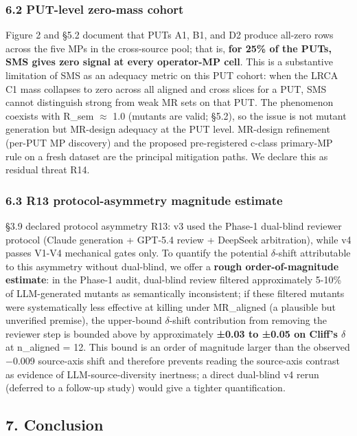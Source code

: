 \documentclass[review,12pt,authoryear]{elsarticle}
\begin{document}
\subsubsection{6.2 PUT-level zero-mass cohort}\label{put-level-zero-mass-cohort}

Figure 2 and §5.2 document that PUTs A1, B1, and D2 produce all-zero
rows across the five MPs in the cross-source pool; that is,
\textbf{for 25\% of the PUTs, SMS gives zero signal at every operator-MP
cell}. This is a substantive limitation of SMS as an adequacy metric on
this PUT cohort: when the LRCA C1 mass collapses to zero across all
aligned and cross slices for a PUT, SMS cannot distinguish strong from
weak MR sets on that PUT. The phenomenon coexists with R\_sem $\approx$ 1.0
(mutants are valid; §5.2), so the issue is not mutant generation but
MR-design adequacy at the PUT level. MR-design refinement (per-PUT
MP discovery) and the proposed pre-registered c-class primary-MP rule
on a fresh dataset are the principal mitigation paths. We declare this
as residual threat R14.

\subsubsection{6.3 R13 protocol-asymmetry magnitude estimate}\label{r13-protocol-asymmetry-magnitude-estimate}

§3.9 declared protocol asymmetry R13: v3 used the Phase-1 dual-blind
reviewer protocol (Claude generation + GPT-5.4 review + DeepSeek
arbitration), while v4 passes V1-V4 mechanical gates only. To quantify
the potential $\delta$-shift attributable to this asymmetry without dual-blind,
we offer a \textbf{rough order-of-magnitude estimate}: in the Phase-1
audit, dual-blind review filtered approximately 5-10\% of LLM-generated
mutants as semantically inconsistent; if these filtered mutants were
systematically less effective at killing under MR\_aligned (a plausible
but unverified premise), the upper-bound $\delta$-shift contribution from
removing the reviewer step is bounded above by approximately
\textbf{±0.03 to ±0.05 on Cliff's $\delta$} at n\_aligned = 12. This bound is
an order of magnitude larger than the observed −0.009 source-axis shift
and therefore prevents reading the source-axis contrast as evidence of
LLM-source-diversity inertness; a direct dual-blind v4 rerun (deferred
to a follow-up study) would give a tighter quantification.


\subsection{7. Conclusion}\label{conclusion}
\end{document}
